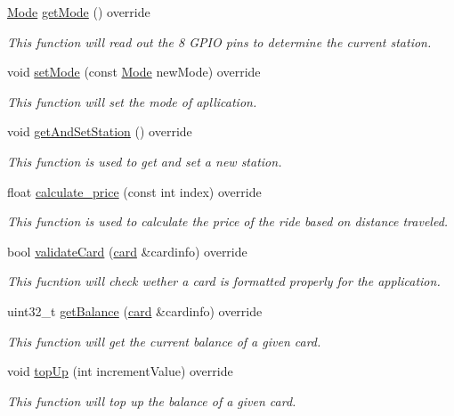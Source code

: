 \begin{DoxyCompactItemize}
\hyperlink{stations_8h_ad03936209251465257e0fdcfb33dbf91}{Mode} \hyperlink{classtrain_ae788938711f5940abc9ad9fa09a77011}{get\+Mode} () override
\begin{DoxyCompactList}\small\item\em This function will read out the 8 G\+P\+IO pins to determine the current station. \end{DoxyCompactList}\item 
void \hyperlink{classtrain_ae4cd3a06c0b736f2de38dd7987e9576e}{set\+Mode} (const \hyperlink{stations_8h_ad03936209251465257e0fdcfb33dbf91}{Mode} new\+Mode) override
\begin{DoxyCompactList}\small\item\em This function will set the mode of apllication. \end{DoxyCompactList}\item 
void \hyperlink{classtrain_a76824298a986f6a897b3e7cba2c8f15d}{get\+And\+Set\+Station} () override
\begin{DoxyCompactList}\small\item\em This function is used to get and set a new station. \end{DoxyCompactList}\item 
float \hyperlink{classtrain_ab027ec1ad985772fbc8b5d65a34da7be}{calculate\+\_\+price} (const int index) override
\begin{DoxyCompactList}\small\item\em This function is used to calculate the price of the ride based on distance traveled. \end{DoxyCompactList}\item 
bool \hyperlink{classtrain_aa484ea80f6754481e8c566da13c72f82}{validate\+Card} (\hyperlink{classcard}{card} \&cardinfo) override
\begin{DoxyCompactList}\small\item\em This fucntion will check wether a card is formatted properly for the application. \end{DoxyCompactList}\item 
uint32\+\_\+t \hyperlink{classtrain_a518b32482f1a5a32cc372b6679644b43}{get\+Balance} (\hyperlink{classcard}{card} \&cardinfo) override
\begin{DoxyCompactList}\small\item\em This function will get the current balance of a given card. \end{DoxyCompactList}\item 
void \hyperlink{classtrain_a1bb8ac7f3f0bf3bfe61cf479abfe4cbb}{top\+Up} (int increment\+Value) override
\begin{DoxyCompactList}\small\item\em This function will top up the balance of a given card. \end{DoxyCompactList}\end{DoxyCompactItemize}
